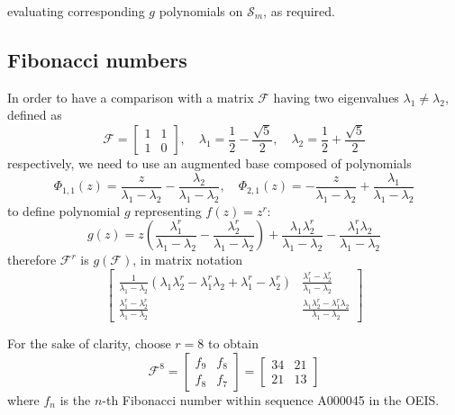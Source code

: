 evaluating corresponding $g$ polynomials on $\mathcal{S}_{m}$, as required.

\subsection{Fibonacci numbers}

In order to have a comparison with a matrix $\mathcal{F}$ having two eigenvalues $\lambda_{1}\neq \lambda_{2}$,
defined as
\begin{displaymath}
\mathcal{F} = \left[\begin{matrix}1 & 1\\1 & 0\end{matrix}\right],
\quad  \lambda_{1} =  \frac{1}{2}- \frac{\sqrt{5}}{2} ,
\quad \lambda_{2} = \frac{1}{2} + \frac{\sqrt{5}}{2}
\end{displaymath}
respectively, we need to use an augmented base composed of polynomials
\begin{displaymath}
 \Phi_{ 1, 1 }{\left (z \right )} = \frac{z}{\lambda_{1} - \lambda_{2}} - \frac{\lambda_{2}}{\lambda_{1} - \lambda_{2}}, \quad  \Phi_{ 2, 1 }{\left (z \right )} = - \frac{z}{\lambda_{1} - \lambda_{2}} + \frac{\lambda_{1}}{\lambda_{1} - \lambda_{2}}
\end{displaymath}
to define polynomial $g$ representing $f(z)=z^{r}$:
\begin{displaymath}
g{\left (z \right )} = z \left(\frac{\lambda_{1}^{r}}{\lambda_{1} - \lambda_{2}} - \frac{\lambda_{2}^{r}}{\lambda_{1} - \lambda_{2}}\right) + \frac{\lambda_{1} \lambda_{2}^{r}}{\lambda_{1} - \lambda_{2}} - \frac{\lambda_{1}^{r} \lambda_{2}}{\lambda_{1} - \lambda_{2}}
\end{displaymath}
therefore $\mathcal{F}^{r}$ is $g(\mathcal{F})$, in matrix notation
\begin{displaymath}
\left[\begin{matrix}\frac{1}{\lambda_{1} - \lambda_{2}} \left(\lambda_{1} \lambda_{2}^{r} - \lambda_{1}^{r} \lambda_{2} + \lambda_{1}^{r} - \lambda_{2}^{r}\right) & \frac{\lambda_{1}^{r} - \lambda_{2}^{r}}{\lambda_{1} - \lambda_{2}}\\\frac{\lambda_{1}^{r} - \lambda_{2}^{r}}{\lambda_{1} - \lambda_{2}} & \frac{\lambda_{1} \lambda_{2}^{r} - \lambda_{1}^{r} \lambda_{2}}{\lambda_{1} - \lambda_{2}}\end{matrix}\right]
\end{displaymath}

For the sake of clarity, choose $r=8$ to obtain
    \begin{displaymath}
    \mathcal{F}^{8} = \left[\begin{matrix}f_{9} & f_{8}\\f_{8} & f_{7}\end{matrix}\right] = \left[\begin{matrix}34 & 21\\21 & 13\end{matrix}\right]
    \end{displaymath}
where $f_{n}$ is the $n$-th Fibonacci number within sequence A000045 in the OEIS.

